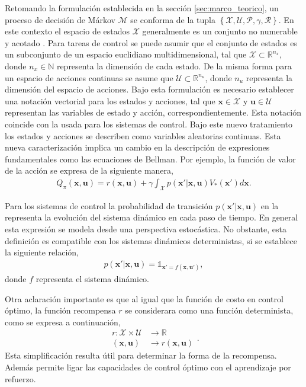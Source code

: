 Retomando la formulación establecida en la sección \ref{sec:marco_teorico}, un proceso de decisión de Márkov $\mathcal{M}$ se conforma de la tupla $\left\{\mathcal{X}, \mathcal{U}, \mathcal{P}, \mathcal{\gamma}, \mathcal{R}\right\}$. En este contexto el espacio de estados $\mathcal{X}$ generalmente es un conjunto no numerable y acotado \cite{wiering2011}. Para tareas de control se puede asumir que el conjunto de estados es un subconjunto de un espacio euclidiano multidimensional, tal que $\mathcal{X}\subset\mathbb{R}^{n_x}$, donde $n_x \in \mathbb{N}$ representa la dimensión de cada estado. De la misma forma para un espacio de acciones continuas se asume que $\mathcal{U}\subset \mathbb{R}^{n_u}$, donde $n_u$ representa la dimensión del espacio de acciones. Bajo esta formulación es necesario establecer una notación vectorial para los estados y acciones, tal que $\mathbf{x}\in \mathcal{X}$ y $\mathbf{u}\in \mathcal{U}$ representan las variables de estado y acción, correspondientemente. Esta notación coincide con la usada para los sistemas de control. Bajo este nuevo tratamiento los estados y acciones se describen como variables aleatorias continuas. Esta nueva caracterización implica un cambio en la descripción de expresiones fundamentales como las ecuaciones de Bellman. Por ejemplo, la función de valor de la acción se expresa de la siguiente manera,
\begin{align}
    Q_{\pi}(\mathbf{x}, \mathbf{u}) = r(\mathbf{x}, \mathbf{u})+ \gamma \int_{\mathcal{X}}p(\mathbf{x}'|\mathbf{x}, \mathbf{u})V_{*}(\mathbf{x}')d\mathbf{x}
   \label{eq:bellman_Q2_cont}.
\end{align}

Para los sistemas de control la probabilidad de transición $p(\mathbf{x}'|\mathbf{x}, \mathbf{u})$ en la  representa la evolución del sistema dinámico en cada paso de tiempo. En general esta expresión se modela desde una perspectiva estocástica. No obstante, esta definición es compatible con los sistemas dinámicos deterministas, si se establece la siguiente relación,
\begin{align}
    p(\mathbf{x}'|\mathbf{x}, \mathbf{u}) = \mathds{1}_{\mathbf{x}'=f(\mathbf{x}, \mathbf{u}')},
\end{align}
donde $f$ representa el sistema dinámico.

Otra aclaración importante es que al igual que la función de costo en control óptimo, la función recompensa $r$ se considerara como una función determinista, como se expresa a continuación, 
\begin{equation}
\begin{aligned}
    r : \mathcal{X}\times\mathcal{U}&\rightarrow \mathbb{R} \\
    (\mathbf{x}, \mathbf{u})&\rightarrow r(\mathbf{x}, \mathbf{u})
\end{aligned}
\label{eq:reward_function}.
\end{equation}
Esta simplificación resulta útil para determinar la forma de la recompensa. Además permite ligar las capacidades de control óptimo con el aprendizaje por refuerzo.

